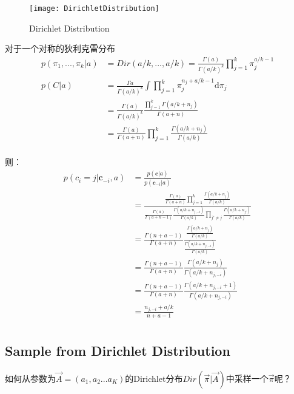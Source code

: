 \begin{figure}[htbp]
\centering
\texttt{[image: DirichletDistribution]}
\caption{Dirichlet Distribution}
\end{figure}

对于一个对称的狄利克雷分布
\begin{displaymath}
\begin{split}
p(\pi_1,...,\pi_k|a)&=Dir(a/k, ... ,a/k) = \frac{\Gamma{(a)}}{{\Gamma{(a/k)}}^k} \prod_{j=1}^{k}{\pi_{j}^{a/k-1}}\\
p(C|a) &= \frac{\Gamma{a}}{\Gamma(a/k)^k} \int \prod_{j=1}^{k} \pi_j^{n_j+a/k-1} \mathrm{d} \pi_j\\
&= \frac{\Gamma{(a)}}{\Gamma(a/k)^k} \frac{\prod_{j=1}^{k}{\Gamma{(a/k +n_j)}}}  {\Gamma{(a + n)}}\\
&= \frac{\Gamma{(a)}}{\Gamma(a+n)} \prod_{j=1}^{k} \frac{\Gamma{(a/k +n_j)}} {\Gamma{(a/k)}}\\
\end{split}
\end{displaymath}

则：
\begin{displaymath}
\begin{split}
p(c_i=j|\mathbf{c}_{-i},a) &= \frac{p(\mathbf{c}|a)}{p(\mathbf{c}_{-i}|a)}\\
&= \frac{ \frac{\Gamma{(a)}}{\Gamma(a+n)} \prod_{j=1}^{k} \frac{\Gamma{(a/k +n_j)}} {\Gamma{(a/k)}}
}{\frac{\Gamma{(a)}}{\Gamma(a+n-1)}  \frac{\Gamma{(a/k +n_{j, -i})}} {\Gamma{(a/k)}} \prod_{j' \neq j} \frac{\Gamma{(a/k +n_{j'})}} {\Gamma{(a/k)}}
}\\
&= \frac{\Gamma{(n+a-1)}}{\Gamma(a+n)} \frac{\frac{\Gamma{(a/k +n_{j})}} {\Gamma{(a/k)}}}{\frac{\Gamma{(a/k +n_{j, -i})}} {\Gamma{(a/k)}}}\\
&= \frac{\Gamma{(n+a-1)}}{\Gamma(a+n)} \frac{\Gamma{(a/k +n_{j})}} {\Gamma{(a/k +n_{j, -i})}} \\
&= \frac{\Gamma{(n+a-1)}}{\Gamma(a+n)} \frac{\Gamma{(a/k +n_{j, -i} +1)}} {\Gamma{(a/k +n_{j, -i})}} \\
&= \frac{n_{j, -i} + a/k}{n+a-1}\\
\end{split}
\end{displaymath}


\subsection{Sample from Dirichlet Distribution}

如何从参数为$\vec{A} = (a_1,a_2...a_K)$的Dirichlet分布$Dir(\vec{\pi}|\vec{A})$中采样一个$\vec{\pi}$呢？

